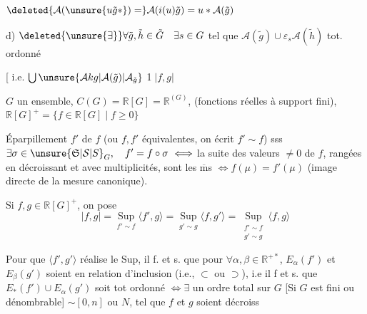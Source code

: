 
\quad
$\deleted{\mathcal A(\unsure{u\tilde g*})=}\mathcal A(i(u)\tilde g)=u*\mathcal A(\tilde g)$

d) $\deleted{\unsure{\exists}}\forall\tilde g,\tilde h\in\tilde G\quad\exists s\in G$ tel que $\mathcal A(\tilde g)\cup\varepsilon_s\mathcal A(\tilde h)$ tot. ordonné

[ i.e. $\bigcup\unsure{\mathcal A k g|\mathcal A(\tilde g)|\mathcal A_{\tilde g}}$
\textcircled{1}\quad $|f,g|$

 $G$ un ensemble, $C(G)=\mathbb R[G]=\mathbb R^{(G)}$, (fonctions réelles à support fini), $\mathbb R[G]^+=\{f\in\mathbb R[G]\mid f\geq0\}$

 Éparpillement $f'$ de $f$ (ou $f,f'$ équivalentes, on écrit $f'\sim f$) sss $\exists\sigma\in \unsure{\mathfrak S|\mathcal S|S}_G,\quad f'=f\circ\sigma\ \Longleftrightarrow$ la suite des valeurs $\ne0$ de $f$,  rangées en décroissant et avec multiplicités, sont les $\overline{\mathrm m}$s $\Longleftrightarrow f(\mu)=f'(\mu)$ (image directe de la mesure canonique).


Si $f,g\in\mathbb R[G]^+$, on pose
\[
 |f,g|=\underset{f'\sim f}{\operatorname{Sup}}\langle f',g\rangle
 =\underset{g'\sim g}{\operatorname{Sup}}\langle f,g'\rangle
 =\underset{\substack{f'\sim f\\g'\sim g}}{\operatorname{Sup}}\langle f,g\rangle
\]

 Pour que $\langle f',g'\rangle$ réalise le Sup, il f. et s. que pour $\forall\alpha,\beta\in\mathbb R^{+*}$, $E_\alpha(f')$ et $E_\beta(g')$ soient en relation d'inclusion (i.e., $\subset$ ou $\supset$), i.e il f et s. que $E_*(f')\cup E_{\alpha}(g')$ soit tot ordonné $\Longleftrightarrow\exists$ un ordre total sur $G$ [Si $G$ est fini ou dénombrable] $\sim[0,n]$ ou $N$, tel que $f$ et $g$ soient décroiss



